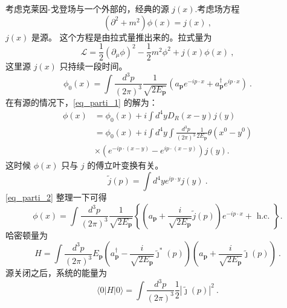 
考虑克莱因-戈登场与一个外部的，经典的源 $j(x)$.考虑场方程
\begin{equation}\label{eq_parti_1}
(\partial^2+m^2)\phi(x) = j(x)~,
\end{equation}
$j(x)$ 是源。 这个方程是由拉式量推出来的。拉式量为
\begin{equation}
\mathcal L = \frac{1}{2} (\partial_\mu\phi)^2 - \frac{1}{2} m^2 \phi^2 + j(x) \phi(x)~,
\end{equation}
这里源 $j(x)$ 只持续一段时间。
\begin{equation}
\phi_{0}(x)=\int \frac{d^{3} p}{(2 \pi)^{3}} \frac{1}{\sqrt{2 E_{\mathbf{p}}}}\left(a_{\mathbf{p}} e^{-i p \cdot x}+a_{\mathbf{p}}^{\dagger} e^{i p \cdot x}\right)~.
\end{equation}
在有源的情况下，\autoref{eq_parti_1} 的解为：
\begin{equation}\label{eq_parti_2}
\begin{aligned}
\phi(x) & =\phi_{0}(x)+i \int d^{4} y D_{R}(x-y) j(y) \\
& =\phi_{0}(x)+i \int d^{4} y \int \frac{d^{3} p}{(2 \pi)^{3}} \frac{1}{2 E_{\mathbf{p}}} \theta\left(x^{0}-y^{0}\right) \\
& \times\left(e^{-i p \cdot(x-y)}-e^{i p \cdot(x-y)}\right) j(y) .
\end{aligned}
\end{equation}
这时候 $\phi(x)$ 只与 $j$ 的傅立叶变换有关。
\begin{equation}
\tilde j (p) = \int d^4 y e^{ip \cdot y} j(y)~.
\end{equation}
\autoref{eq_parti_2} 整理一下可得
\begin{equation}
\phi(x)=\int \frac{d^{3} p}{(2 \pi)^{3}} \frac{1}{\sqrt{2 E_{\mathbf{p}}}}\left\{\left(a_{\mathbf{p}}+\frac{i}{\sqrt{2 E_{\mathbf{p}}}} \tilde{j}(p)\right) e^{-i p \cdot x}+\text { h.c. }\right\} .
\end{equation}
哈密顿量为
\begin{equation}
H=\int \frac{d^{3} p}{(2 \pi)^{3}} E_{\mathbf{p}}\left(a_{\mathbf{p}}^{\dagger}-\frac{i}{\sqrt{2 E_{\mathbf{p}}}} \tilde{\jmath}^{*}(p)\right)\left(a_{\mathbf{p}}+\frac{i}{\sqrt{2 E_{\mathbf{p}}}} \tilde{\jmath}(p)\right)~.
\end{equation}
源关闭之后，系统的能量为
\begin{equation}
\langle 0|H| 0\rangle=\int \frac{d^{3} p}{(2 \pi)^{3}} \frac{1}{2}|\tilde{\jmath}(p)|^{2}~.
\end{equation}

